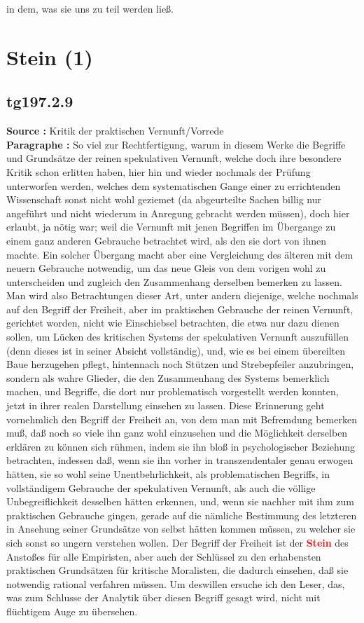 \documentclass[a4paper,12pt,twoside]{book}
\newcommand{\match}[1]{\textcolor{red}{\textbf{#1}}}
\newcommand{\unnumberedsection}[1]{
	\section*{#1}
	\addcontentsline{toc}{section}{#1}
	\markright{#1}
}
\begin{document}
in dem, was sie uns zu teil werden ließ. 
	
	\unnumberedsection{Stein (1)} 
	\subsection*{tg197.2.9} 
	\textbf{Source : }Kritik der praktischen Vernunft/Vorrede\\  
	
	\noindent\textbf{Paragraphe : }So viel zur Rechtfertigung, warum in diesem Werke die Begriffe und Grundsätze der reinen spekulativen Vernunft, welche doch ihre besondere Kritik schon erlitten haben, hier hin und wieder nochmals der Prüfung unterworfen werden, welches dem systematischen Gange einer zu errichtenden Wissenschaft sonst nicht wohl geziemet (da abgeurteilte Sachen billig nur angeführt und nicht wiederum in Anregung gebracht werden müssen), doch hier erlaubt, ja nötig war; weil die Vernunft mit jenen Begriffen im Übergange zu einem ganz anderen Gebrauche betrachtet wird, als den sie dort von ihnen machte. Ein solcher Übergang macht aber eine Vergleichung des älteren mit dem neuern Gebrauche notwendig, um das neue Gleis von dem vorigen wohl zu unterscheiden und zugleich den Zusammenhang derselben bemerken zu lassen. Man wird also Betrachtungen dieser Art, unter andern diejenige, welche nochmals auf den Begriff der Freiheit, aber im praktischen Gebrauche der reinen Vernunft, gerichtet worden, nicht wie Einschiebsel betrachten,  die etwa nur dazu dienen sollen, um Lücken des kritischen Systems der spekulativen Vernunft auszufüllen (denn dieses ist in seiner Absicht vollständig), und, wie es bei einem übereilten Baue herzugehen pflegt, hintennach noch Stützen und Strebepfeiler anzubringen, sondern als wahre Glieder, die den Zusammenhang des Systems bemerklich machen, und Begriffe, die dort nur problematisch vorgestellt werden konnten, jetzt in ihrer realen Darstellung einsehen zu lassen. Diese Erinnerung geht vornehmlich den Begriff der Freiheit an, von dem man mit Befremdung bemerken muß, daß noch so viele ihn ganz wohl einzusehen und die Möglichkeit derselben erklären zu können sich rühmen, indem sie ihn bloß in psychologischer Beziehung betrachten, indessen daß, wenn sie ihn vorher in transzendentaler genau erwogen hätten, sie so wohl seine Unentbehrlichkeit, als problematischen Begriffs, in vollständigem Gebrauche der spekulativen Vernunft, als auch die völlige Unbegreiflichkeit desselben hätten erkennen, und, wenn sie nachher mit ihm zum praktischen Gebrauche gingen, gerade auf die nämliche Bestimmung des letzteren in Ansehung seiner Grundsätze von selbst hätten kommen müssen, zu welcher sie sich sonst so ungern verstehen wollen. Der Begriff der Freiheit ist der \match{Stein} des Anstoßes für alle Empiristen, aber auch der Schlüssel zu den erhabensten praktischen Grundsätzen für kritische Moralisten, die dadurch einsehen, daß sie notwendig rational verfahren müssen. Um deswillen ersuche ich den Leser, das, was zum Schlusse der Analytik über diesen Begriff gesagt wird, nicht mit flüchtigem Auge zu übersehen. 
	
\end{document}
